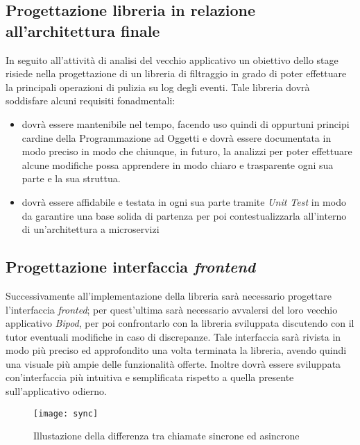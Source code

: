 \subsection{Progettazione libreria in relazione all'architettura finale}
In seguito all'attività di analisi del vecchio applicativo un obiettivo dello stage risiede nella progettazione di un libreria di filtraggio in grado di poter effettuare la principali operazioni di pulizia su log degli eventi. Tale libreria dovrà soddisfare alcuni requisiti fonadmentali:
\begin{itemize}
	\item dovrà essere mantenibile nel tempo, facendo uso quindi di oppurtuni principi cardine della Programmazione ad Oggetti e dovrà essere documentata in modo preciso in modo che chiunque, in futuro, la analizzi per poter effettuare alcune modifiche possa apprendere in modo chiaro e trasparente ogni sua parte e la sua struttua.
	\item dovrà essere affidabile e testata in ogni sua parte tramite \textit{Unit Test} in modo da garantire una base solida di partenza per poi contestualizzarla all'interno di un'architettura a microservizi
\end{itemize}
\subsection{Progettazione interfaccia \textit{frontend}}
Successivamente all'implementazione della libreria sarà necessario progettare l'interfaccia \textit{fronted}; per quest'ultima sarà necessario avvalersi del loro vecchio applicativo \textit{Bipod}, per poi confrontarlo con la libreria sviluppata discutendo con il tutor eventuali modifiche in caso di discrepanze. Tale interfaccia sarà rivista in modo più preciso ed approfondito una volta terminata la libreria, avendo quindi una visuale più ampie delle funzionalità offerte. Inoltre dovrà essere sviluppata con'interfaccia più intuitiva e semplificata rispetto a quella presente sull'applicativo odierno.
\begin{figure}[!h] 
	\centering 
	\texttt{[image: sync]} 
	\caption{Illustazione della differenza tra chiamate sincrone ed asincrone}
\end{figure}
\newpage
